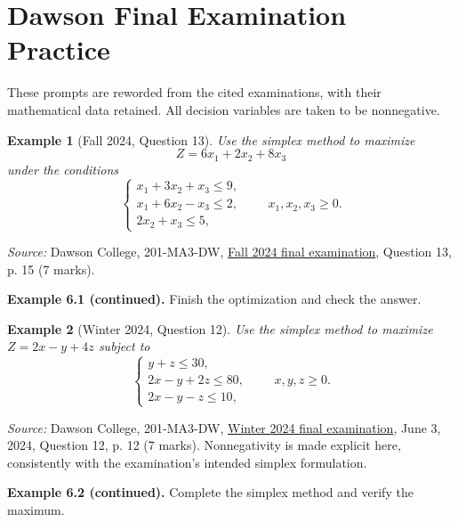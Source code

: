 \documentclass{article}
\theoremstyle{plain}
\newtheorem{example}{Example}[section]
\theoremstyle{definition}
\theoremstyle{remark}
\newcommand{\work}{\par\vfill}
\begin{document}
\work

\newpage
\section{Dawson Final Examination Practice}
These prompts are reworded from the cited examinations, with their mathematical data retained. All decision variables are taken to be nonnegative.
\begin{example}[Fall 2024, Question 13]\label{ex:dawsonfall}
Use the simplex method to maximize
\[
Z=6x_1+2x_2+8x_3
\]
under the conditions
\[
\begin{cases}x_1+3x_2+x_3\le9,\\x_1+6x_2-x_3\le2,\\2x_2+x_3\le5,\end{cases}\qquad x_1,x_2,x_3\ge0.
\]
\end{example}
{\small\textit{Source:} Dawson College, 201-MA3-DW, \href{https://www.dawsoncollege.qc.ca/mathematics/wp-content/uploads/sites/113/Fall-2024-3.pdf}{Fall 2024 final examination}, Question 13, p. 15 (7 marks).}

\work

\newpage
\textbf{Example 6.1 (continued).} Finish the optimization and check the answer.

\work

\newpage
\begin{example}[Winter 2024, Question 12]\label{ex:dawsonwinter}
Use the simplex method to maximize $Z=2x-y+4z$ subject to
\[
\begin{cases}y+z\le30,\\2x-y+2z\le80,\\2x-y-z\le10,\end{cases}\qquad x,y,z\ge0.
\]
\end{example}
{\small\textit{Source:} Dawson College, 201-MA3-DW, \href{https://www.dawsoncollege.qc.ca/mathematics/wp-content/uploads/sites/113/Winter-2024-3.pdf}{Winter 2024 final examination}, June 3, 2024, Question 12, p. 12 (7 marks). Nonnegativity is made explicit here, consistently with the examination's intended simplex formulation.}

\work

\newpage
\textbf{Example 6.2 (continued).} Complete the simplex method and verify the maximum.

\work
\end{document}
